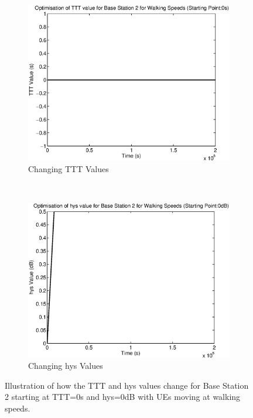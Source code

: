 \begin{figure}[H]
        \centering
        \begin{subfigure}[b]{0.49\textwidth}
                \includegraphics[width=\textwidth]{figures/graphs/walklow/TTT2.eps}
                \caption{Changing TTT Values}
        \end{subfigure}%
        ~ %
        \begin{subfigure}[b]{0.49\textwidth}
                \includegraphics[width=\textwidth]{figures/graphs/walklow/hys2.eps}
                \caption{Changing hys Values}
        \end{subfigure}
        \caption{Illustration of how the TTT and hys values change for Base Station 2 starting at TTT=0s and hys=0dB with UEs moving at walking speeds.}
\end{figure}
